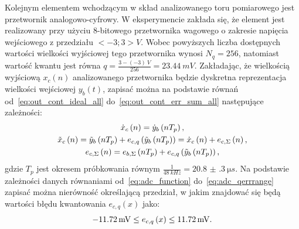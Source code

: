 Kolejnym elementem wchodzącym w skład analizowanego toru pomiarowego jest przetwornik analogowo-cyfrowy. W eksperymencie zakłada się, że element jest realizowany przy użyciu 8-bitowego przetwornika wagowego o zakresie napięcia wejściowego z przedziału $<-3;3>\unit{V}$. Wobec powyższych liczba dostępnych wartości wielkości wyjściowej tego przetwornika wynosi $N_{q} = 256$, natomiast wartość kwantu jest równa $q = \frac{3 - (-3)~\unit{V}}{256} = \qty{23.44}{mV}$. Zakładając, że wielkością wyjściową $x_{c}(n)$ analizowanego przetwornika będzie dyskretna reprezentacja wielkości wejściowej $y_{b}(t)$, zapisać można na podstawie równań od~\eqref{eq:out_cont_ideal_all} do~\eqref{eq:out_cont_err_sum_all} następujące zależności:
\begin{gather}
\dot{x}_{c} \left(n\right) = \dot{y}_{b} \left(nT_{p}\right) \label{eq:sym_partc_out_ideal}, \\
\tilde{x}_{c} \left(n\right) = \tilde{y}_{b} \left(nT_{p}\right) + e_{c,q} \left( \tilde{y}_{b} \left(nT_{p}\right) \right) = \dot{x}_{c} \left(n\right) + e_{c,\Sigma} \left(n\right) \label{eq:sym_partc_out_real}, \\
e_{c,\Sigma} \left(n\right) = e_{b,\Sigma} \left(nT_{p}\right) + e_{c,q} \left( \tilde{y}_{b} \left(nT_{p}\right) \right) \label{eq:sym_partc_error_sum},
\end{gather}
gdzie $T_{p}$ jest okresem próbkowania równym $\frac{1}{\qty{48}{kHz}} = \qty{20.8(3)}{\micro s}$.
Na podstawie zależności danych równaniami od~\eqref{eq:adc_function} do~\eqref{eq:adc_qerrrange} zapisać można nierówność określającą przedział, w jakim znajdować się będą wartości błędu kwantowania $e_{c,q}(x)$ jako:
\begin{equation}
\qty{-11.72}{mV} \le e_{c,q} \left(x\right) \le \qty{11.72}{mV} \label{eq:sym_partc_error_quant}.
\end{equation}

